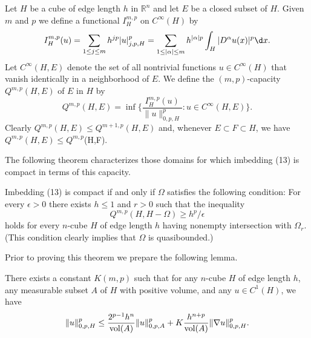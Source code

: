 \begin{para}
  Let $H$ be a cube of edge length $h$ in $\mathbb{R}^n$ and let $E$ be a closed subset of $H$.
  Given $m$ and $p$ we define a functional $I_H^{m,p}$ on $C^\infty(H)$ by
  \[ I_H^{m,p}(u) = \sum_{1\leq j\leq m} h^{jp} |u|_{j,p,H}^p
     = \sum_{1\leq |\alpha|\leq m} h^{|\alpha|p} \int_H |D^\alpha u(x)|^p \d x. \]
  Let $C^\infty(H,E)$ denote the set of all nontrivial functions $u\in C^\infty(H)$
  that vanish identically in a neighborhood of $E$. We define the $(m,p)$-capacity
  $Q^{m,p}(H,E)$ of $E$ in $H$ by
  \[ Q^{m,p}(H,E) = \inf \biggl\{ \frac{I_H^{m,p}(u)}{\|u\|_{0,p,H}^p}
     : u\in C^\infty(H,E)\biggr\}. \]
  Clearly $Q^{m,p}(H,E) \leq Q^{m+1,p}(H,E)$ and, whenever $E\subset F\subset H$,
  we have $Q^{m,p}(H,E) \leq Q^{m,p}$(H,F).
\end{para}

The following theorem characterizes those domains for which imbedding (13)
is compact in terms of this capacity.


\begin{theorem}
  Imbedding (13) is compact if and only if $\Omega$ satisfies the following condition:
  For every $\epsilon>0$ there exists $h\leq 1$ and $r>0$ such that the inequality
  \[ Q^{m,p}(H,H-\Omega) \geq h^p/\epsilon \]
  holds for every $n$-cube $H$ of edge length $h$ having nonempty intersection
  with $\Omega_r$. (This condition clearly implies that $\Omega$ is quasibounded.)
\end{theorem}

Prior to proving this theorem we prepare the following lemma.


\begin{lemma}
  There exists a constant $K(m,p)$ such that for any $n$-cube $H$ of edge length $h$,
  any measurable subset $A$ of $H$ with positive volume, and any $u\in C^1(H)$, we have
  \[ \|u\|_{0,p,H}^p \leq \frac{2^{p-1}h^n}{\operatorname{vol}(A)} \|u\|_{0,p,A}^p
      + K \frac{h^{n+p}}{\operatorname{vol}(A)} \|\nabla u\|_{0,p,H}^p. \]
\end{lemma}


